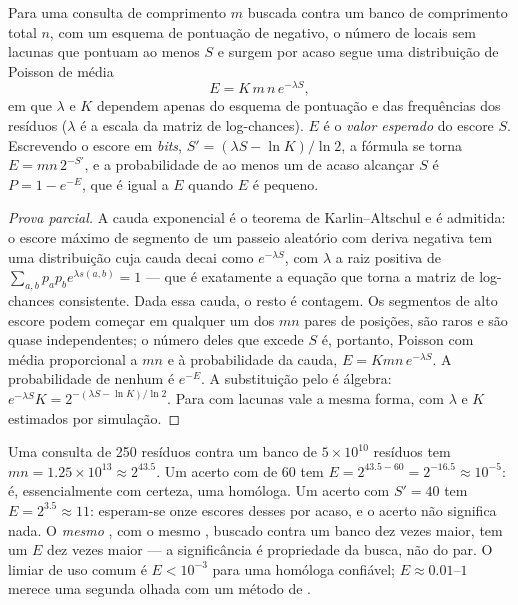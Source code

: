 \begin{theorem}\label{thm:b3:bioinformatics:evalue}
Para uma consulta de comprimento $m$ buscada contra um banco de
comprimento total $n$, com um esquema de pontuação de 
negativo, o número de  locais sem lacunas que pontuam ao
menos $S$ e surgem por acaso segue uma distribuição de Poisson de média
\[
E = K\,m\,n\,e^{-\lambda S},
\]
em que $\lambda$ e $K$ dependem apenas do esquema de pontuação e das
frequências dos resíduos ($\lambda$ é a escala da matriz de
log-chances). $E$ é o \emph{valor esperado} do escore $S$. Escrevendo o
escore em \emph{bits}, $S' = (\lambda S - \ln K)/\ln 2$, a fórmula se
torna $E = m n\, 2^{-S'}$, e a probabilidade de ao menos um 
de acaso alcançar $S$ é $P = 1 - e^{-E}$, que é igual a $E$ quando $E$ é
pequeno.
\end{theorem}
\begin{proof}[Prova parcial]
A cauda exponencial é o teorema de Karlin--Altschul e é admitida: o
escore máximo de segmento de um passeio aleatório com deriva negativa
tem uma distribuição cuja cauda decai como $e^{-\lambda S}$, com
$\lambda$ a raiz positiva de
$\sum_{a,b} p_{a} p_{b} e^{\lambda s(a,b)} = 1$ --- que é exatamente a
equação que torna a matriz de log-chances consistente. Dada essa
cauda, o resto é contagem. Os segmentos de alto escore podem começar em
qualquer um dos $mn$ pares de posições, são raros e são quase
independentes; o número deles que excede $S$ é, portanto, Poisson com
média proporcional a $mn$ e à probabilidade da cauda,
$E = Kmn\,e^{-\lambda S}$. A probabilidade de nenhum é $e^{-E}$. A
substituição pelo  é álgebra: $e^{-\lambda S} K = 2^{-(\lambda S -
\ln K)/\ln 2}$. Para  com lacunas vale a
mesma forma, com $\lambda$ e $K$ estimados por simulação.
\end{proof}

\begin{example}\label{ex:b3:bioinformatics:evalue}
Uma consulta de \num{250} resíduos contra um banco de $5\times 10^{10}$
resíduos tem $mn = 1.25\times 10^{13} \approx 2^{43.5}$. Um acerto com
 de $60$ tem $E = 2^{43.5 - 60} = 2^{-16.5} \approx 10^{-5}$: é, essencialmente com certeza, uma homóloga. Um acerto com
$S' = 40$ tem $E = 2^{3.5}
\approx 11$: esperam-se onze escores desses
por acaso, e o acerto não significa nada. O \emph{mesmo} ,
com o mesmo , buscado contra um banco dez vezes maior,
tem um $E$ dez vezes maior --- a significância é propriedade da busca,
não do par. O limiar de uso comum é $E < 10^{-3}$ para uma homóloga
confiável; $E \approx 0.01$--$1$ merece uma segunda olhada com um
método de .
\end{example}

